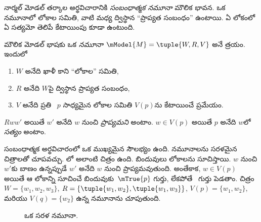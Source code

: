 \documentclass[../../../include/open-logic-section]{subfiles}
\begin{document}


నార్మల్ మోడల్ తర్కాల అర్థవిచారానికి
\emph{సంబంధాత్మక నమూనా} మౌలిక భావన. ఒక నమూనాలో లోకాల
సమితి, వాటి మధ్య ద్విస్థాన “ప్రాప్యత సంబంధం” ఉంటాయి.
ఏ లోకంలో ఏ 
సత్యమో తెలిపే కేటాయింపు కూడా ఉంటుంది.

\begin{defn}
  మౌలిక మోడల్ భాషకు ఒక \emph{నమూనా}
  $\mModel{M} = \tuple{W, R, V}$ అనే
  త్రయం. ఇందులో
  \begin{enumerate}
  \item $W$ అనేది ఖాళీ కాని “లోకాల” సమితి,
  \item $R$ అనేది $W$పై ద్విస్థాన ప్రాప్యత సంబంధం,
  \item $V$ అనేది ప్రతి
    ~$p$ సాధ్యమైన లోకాల
    సమితి $V(p)$ను కేటాయించే ప్రమేయం.
  \end{enumerate}
  $Rww'$ అయితే $w'$ అనేది $w$ నుంచి
  \emph{ప్రాప్యమని} అంటాం. $w \in V(p)$ అయితే
  $p$ అనేది $w$లో \emph{సత్యం} అంటాం.
\end{defn}

సంబంధాత్మక అర్థవిచారంలో ఒక ముఖ్యమైన సౌలభ్యం ఉంది.
నమూనాలను సరళమైన చిత్రాలతో చూపవచ్చు. లో
అలాంటి చిత్రం ఉంది. బిందువులు లోకాలను సూచిస్తాయి.
$w$ నుంచి $w'$కు బాణం ఉన్నప్పుడే $w'$ అనేది
$w$ నుంచి ప్రాప్యమవుతుంది. అంతేకాక,
$w \in V(p)$ అయితే ఆ లోకాన్ని సూచించే
బిందువుకు~$\mTrue{p}$ గుర్తు,
లేకపోతే~ గుర్తు పెడతాం.
 చిత్రం
$W = \{w_1, w_2, w_3\}$,
$R = \{\tuple{w_1, w_2},\tuple{w_1,
  w_3}\}$, $V(p) = \{w_1, w_2\}$,
మరియు $V(q) = \{w_2\}$ ఉన్న
నమూనాను చూపుతుంది.

\begin{figure}
  \begin{center}
  \end{center}
  \caption{ఒక సరళ నమూనా.}
\end{figure}
\end{document}
